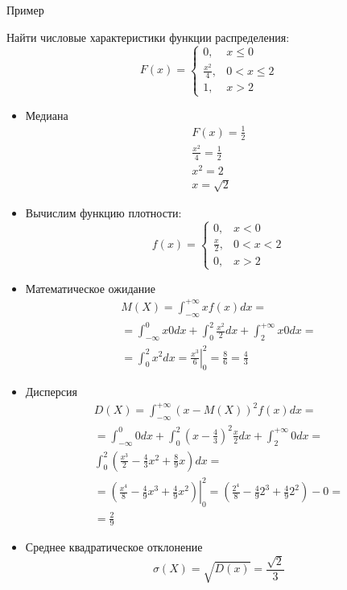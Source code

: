 \documentclass[unicode,11pt,notheorems,xcolor=table]{beamer}
\begin{document}
\begin{frame}[allowframebreaks]{Пример}{}
    \begin{exampleblock}{}
        Найти числовые характеристики функции распределения:
        $$
        F(x) = \begin{cases}
            0, & x\leqslant 0\\
            \frac{x^2}{4}, & 0<x\leqslant 2\\
            1, &  x>2
        \end{cases}
        $$
    \end{exampleblock}
    \begin{itemize}
        \item Медиана 
        $$\begin{gathered}
            F(x)=\frac{1}{2}    \\
            \frac{x^2}{4} = \frac{1}{2}\\
            x^2=2\\
            x=\sqrt{2}
        \end{gathered}
        $$
        \item Вычислим функцию плотности:
        $$
        f(x) = \begin{cases}
            0, & x< 0\\
            \frac{x}{2}, & 0<x< 2\\
            0, &  x>2
        \end{cases}
        $$
        \item Математическое ожидание
        \begin{multline*}
            M(X)= \int_{-\infty}^{+\infty} xf(x)dx
            =\\
            = \int_{-\infty}^0 x0dx + \int_{0}^2 \frac{x^2}{2} dx + \int_2^{+\infty} x0 dx  
             =\\
             = \int_{0}^2 x^2 dx
            = \left. \frac{x^3}{6} \right|_0^2 = \frac{8}{6} =\frac{4}{3}
        \end{multline*}



        \item Дисперсия
        \begin{multline*}
            D(X)= \int_{-\infty}^{+\infty} (x-M(X))^2f(x)dx
            =\\
            = \int_{-\infty}^0 0dx + \int_{0}^2 \left(x-\frac{4}{3}\right)^2 \frac{x}{2} dx + \int_2^{+\infty} 0 dx  
             =\\
             \int_{0}^2 \left( \frac{x^3}{2} -\frac{4}{3}x^2 +\frac{8}{9}x \right)dx
             =\\
             =\left. \left( \frac{x^4}{8} -\frac{4}{9}x^3 +\frac{4}{9}x^2 \right)\right|_{0}^{2}
            = \left(\frac{2^4}{8} -\frac{4}{9}2^3 +\frac{4}{9}2^2\right) - 0
            =\\
            = \frac{2}{9}
        \end{multline*}

        \item Среднее квадратическое отклонение
        $$
            \sigma(X) =\sqrt{D(x)}= \frac{\sqrt{2}}{3}
        $$
    \end{itemize}
\end{frame}
\end{document}
